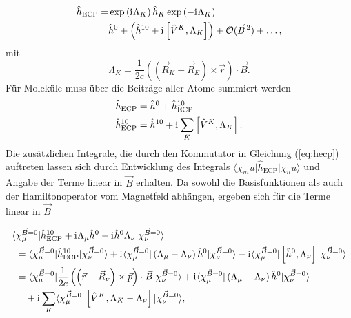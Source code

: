 	\begin{equation}
	\begin{aligned}
	\hat{h}_{\textrm{ECP}}=&\exp\left(\mathrm{i}\mkern1mu\Lambda_K\right)\hat{h}_K\exp\left(-\mathrm{i}\mkern1mu\Lambda_K\right)\\
	=&\hat{h}^0+\left(\hat{h}^{10}+\mathrm{i}\mkern1mu\left[\hat{V}^K,\Lambda_K\right]\right)+\mathcal{O}(\vec{B}^{\,2})+\dotsc,
	\end{aligned}
	\end{equation}
	mit
	\begin{equation}
	\Lambda_K=\frac{1}{2c}\left(\left(\vec{R}_K-\vec{R}_E\right)\times\vec{r}\right)\cdot\vec{B}.
	\end{equation}
	Für Moleküle muss über die Beiträge aller Atome summiert werden
	\begin{equation}\label{eq:hecp}
	\begin{aligned}
	&\hat{h}_{\textrm{ECP}}=\hat{h}^0+\hat{h}_{\textrm{ECP}}^{10}\\
	&\hat{h}_{\textrm{ECP}}^{10}=\hat{h}^{10}+\mathrm{i}\mkern1mu\sum_K\left[\hat{V}^K,\Lambda_K\right].
	\end{aligned}
	\end{equation}	 
	Die zusätzlichen Integrale, die durch den Kommutator in Gleichung (\ref{eq:hecp}) auftreten lassen sich durch Entwicklung des Integrals $\langle\chi_mu\vert\hat{h}_{\textrm{ECP}}\vert\chi_nu\rangle$ und Angabe der Terme linear in $\vec{B}$ erhalten. Da sowohl die Basisfunktionen als auch der Hamiltonoperator vom Magnetfeld abhängen, ergeben sich für die Terme linear in $\vec{B}$
	
	\begin{equation}\label{eq:linearinb}
	\begin{aligned}
	\langle &\chi_\mu^{\vec{B}=0}\vert\hat{h}_{\textrm{ECP}}^{10}+\mathrm{i}\mkern1mu\Lambda_\mu\hat{h}^0-\mathrm{i}\mkern1mu\hat{h}^0\Lambda_\nu\vert\chi_\nu^{\vec{B}=0}\rangle\\
	&=\langle \chi_\mu^{\vec{B}=0}\vert\hat{h}_{\textrm{ECP}}^{10}\vert\chi_\nu^{\vec{B}=0}\rangle+\mathrm{i}\mkern1mu\langle\chi_\mu^{\vec{B}=0}\vert\left(\Lambda_\mu -\Lambda_\nu\right)\hat{h}^0\vert\chi_\nu^{\vec{B}=0}\rangle-\mathrm{i}\mkern1mu\langle\chi_\mu^{\vec{B}=0}\vert\left[\hat{h}^0 ,\Lambda_\nu\right]\vert\chi_\nu^{\vec{B}=0}\rangle\\
    &=\langle \chi_\mu^{\vec{B}=0}\vert\frac{1}{2c}\left(\left(\vec{r}-\vec{R}_\nu\right)\times\vec{p}\right)\cdot\vec{B}\vert\chi_\nu^{\vec{B}=0}\rangle
    +\mathrm{i}\mkern1mu\langle\chi_\mu^{\vec{B}=0}\vert\left(\Lambda_\mu -\Lambda_\nu\right)\hat{h}^0\vert\chi_\nu^{\vec{B}=0}\rangle\\
    &\quad+\mathrm{i}\mkern1mu\sum_K\langle \chi_\mu^{\vec{B}=0}\vert\left[\hat{V}^{K},\Lambda_K-\Lambda_\nu\right]\vert\chi_\nu^{\vec{B}=0}\rangle,
	\end{aligned}
	\end{equation}
	
